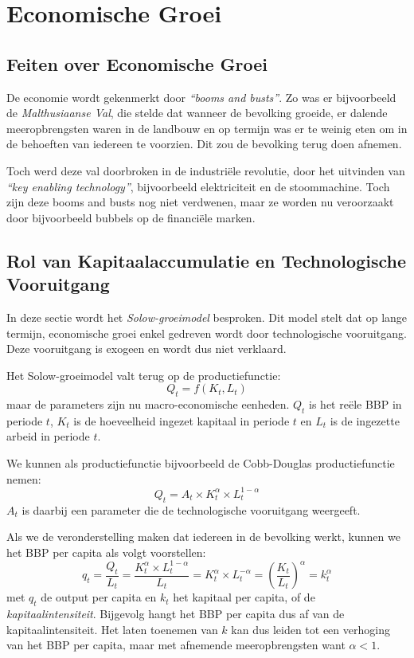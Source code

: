 \section{Economische Groei}

\subsection{Feiten over Economische Groei}
De economie wordt gekenmerkt door \textit{``booms and busts''}. Zo was er bijvoorbeeld de \textit{Malthusiaanse Val}, die stelde dat wanneer de bevolking groeide, er dalende meeropbrengsten waren in de landbouw en op termijn was er te weinig eten om in de behoeften van iedereen te voorzien. Dit zou de bevolking terug doen afnemen.

Toch werd deze val doorbroken in de industri\"ele revolutie, door het uitvinden van \textit{``key enabling technology''}, bijvoorbeeld elektriciteit en de stoommachine. Toch zijn deze booms and busts nog niet verdwenen, maar ze worden nu veroorzaakt door bijvoorbeeld bubbels op de financi\"ele marken.

\subsection{Rol van Kapitaalaccumulatie en Technologische Vooruitgang}
In deze sectie wordt het \textit{Solow-groeimodel} besproken. Dit model stelt dat op lange termijn, economische groei enkel gedreven wordt door technologische vooruitgang. Deze vooruitgang is exogeen en wordt dus niet verklaard.

Het Solow-groeimodel valt terug op de productiefunctie:
\begin{equation}
    Q_t = f(K_t, L_t)
\end{equation}
maar de parameters zijn nu macro-economische eenheden. $Q_t$ is het re\"ele BBP in periode $t$, $K_t$ is de hoeveelheid ingezet kapitaal in periode $t$ en $L_t$ is de ingezette arbeid in periode $t$.

We kunnen als productiefunctie bijvoorbeeld de Cobb-Douglas productiefunctie nemen:
\begin{equation}
    Q_t = A_t \times K_t^\alpha \times L_t^{1-\alpha}
\end{equation}
$A_t$ is daarbij een parameter die de technologische vooruitgang weergeeft.

Als we de veronderstelling maken dat iedereen in de bevolking werkt, kunnen we het BBP per capita als volgt voorstellen:
\begin{equation}
    q_t = \frac{Q_t}{L_t} = \frac{K_t^\alpha \times L_t^{1-\alpha}}{L_t} = K_t^\alpha \times L_t^{-\alpha} = \left( \frac{K_t}{L_t} \right)^\alpha = k_t^\alpha
\end{equation}
met $q_t$ de output per capita en $k_t$ het kapitaal per capita, of de \textit{kapitaalintensiteit}. Bijgevolg hangt het BBP per capita dus af van de kapitaalintensiteit. Het laten toenemen van $k$ kan dus leiden tot een verhoging van het BBP per capita, maar met afnemende meeropbrengsten want $\alpha < 1$.

